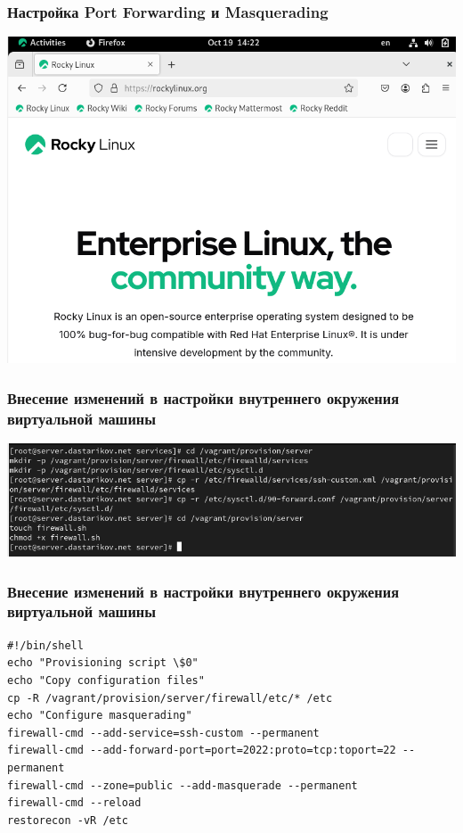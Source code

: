 \begin{frame}
\frametitle{Настройка Port Forwarding и Masquerading}
    \includegraphics[width=\textwidth]{../images/image11.png}
\end{frame}

\begin{frame}
\frametitle{Внесение изменений в настройки внутреннего окружения виртуальной машины}
    \includegraphics[width=\textwidth]{../images/image12.png}
\end{frame}

\begin{frame}[containsverbatim]
\frametitle{Внесение изменений в настройки внутреннего окружения виртуальной машины}
    \begin{verbatim}
#!/bin/shell
echo "Provisioning script \$0"
echo "Copy configuration files"
cp -R /vagrant/provision/server/firewall/etc/* /etc
echo "Configure masquerading"
firewall-cmd --add-service=ssh-custom --permanent
firewall-cmd --add-forward-port=port=2022:proto=tcp:toport=22 --permanent
firewall-cmd --zone=public --add-masquerade --permanent
firewall-cmd --reload
restorecon -vR /etc
    \end{verbatim}
\end{frame}

